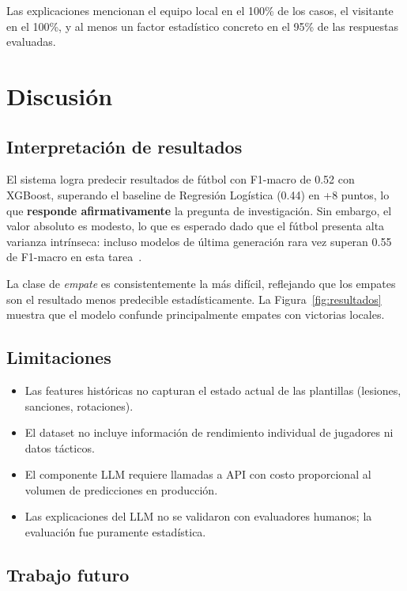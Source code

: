 \documentclass[10pt,twocolumn]{article}
\begin{document}
Las explicaciones mencionan el equipo local en el 100\% de los
casos, el visitante en el 100\%, y al menos un factor estadístico
concreto en el 95\% de las respuestas evaluadas.

\section{Discusión}

\subsection{Interpretación de resultados}

El sistema logra predecir resultados de fútbol con F1-macro de
0.52 con XGBoost, superando el baseline de Regresión Logística
(0.44) en +8 puntos, lo que \textbf{responde afirmativamente}
la pregunta de investigación. Sin embargo, el valor absoluto es
modesto, lo que es esperado dado que el fútbol presenta alta
varianza intrínseca: incluso modelos de última generación rara
vez superan 0.55 de F1-macro en esta tarea~\cite{tax2015}.

La clase de \textit{empate} es consistentemente la más difícil,
reflejando que los empates son el resultado menos predecible
estadísticamente. La Figura~\ref{fig:resultados} muestra que
el modelo confunde principalmente empates con victorias locales.

\subsection{Limitaciones}

\begin{itemize}[leftmargin=*,topsep=2pt,itemsep=1pt]
  \item Las features históricas no capturan el estado actual
        de las plantillas (lesiones, sanciones, rotaciones).
  \item El dataset no incluye información de rendimiento
        individual de jugadores ni datos tácticos.
  \item El componente LLM requiere llamadas a API con costo
        proporcional al volumen de predicciones en producción.
  \item Las explicaciones del LLM no se validaron con evaluadores
        humanos; la evaluación fue puramente estadística.
\end{itemize}

\subsection{Trabajo futuro}
\end{document}

